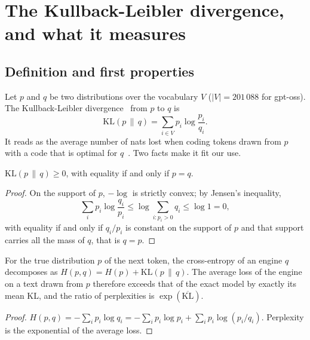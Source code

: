 \section{The Kullback-Leibler divergence, and what it measures}\label{sec:t2r-kl}

\subsection{Definition and first properties}

Let $p$ and $q$ be two distributions over the vocabulary $V$ ($|V| = 201\,088$ for gpt-oss). The Kullback-Leibler divergence~\cite{kullback1951} from $p$ to $q$ is
\begin{equation}\label{eq:t2r-kl}
\mathrm{KL}(p \,\|\, q) = \sum_{i \in V} p_i \log\frac{p_i}{q_i}.
\end{equation}
It reads as the average number of nats lost when coding tokens drawn from $p$ with a code that is optimal for $q$~\cite{cover2006}. Two facts make it fit our use.

\begin{theoreme}\label{thm:t2r-gibbs}
$\mathrm{KL}(p\,\|\,q) \ge 0$, with equality if and only if $p = q$.
\end{theoreme}

\begin{proof}
On the support of $p$, $-\log$ is strictly convex; by Jensen's inequality,
\[
\sum_i p_i \log\frac{q_i}{p_i} \le \log \sum_{i : p_i > 0} q_i \le \log 1 = 0,
\]
with equality if and only if $q_i/p_i$ is constant on the support of $p$ and that support carries all the mass of $q$, that is $q = p$.
\end{proof}

\begin{proposition}\label{prop:t2r-croisee}
For the true distribution $p$ of the next token, the cross-entropy of an engine $q$ decomposes as $H(p, q) = H(p) + \mathrm{KL}(p\,\|\,q)$. The average loss of the engine on a text drawn from $p$ therefore exceeds that of the exact model by exactly its mean KL, and the ratio of perplexities is $\exp(\overline{\mathrm{KL}})$.
\end{proposition}

\begin{proof}
$H(p, q) = -\sum_i p_i \log q_i = -\sum_i p_i \log p_i + \sum_i p_i \log(p_i/q_i)$. Perplexity is the exponential of the average loss.
\end{proof}

